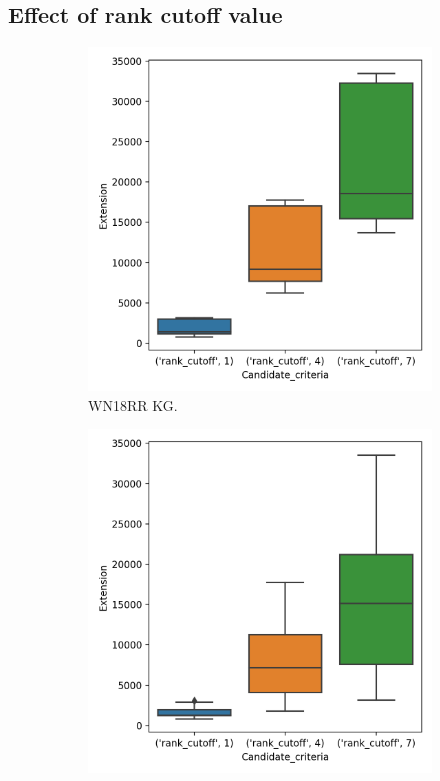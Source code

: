 \newpage
\subsection{Effect of rank cutoff value}

\begin{figure}[h]
\centering
\begin{subfigure}{.5\textwidth}
  \centering
  \includegraphics[width=1\linewidth]{figures/results/ranks/Extension_size_entity_wn18rr.png}
  \caption{WN18RR KG.}
  \label{fig:rank_extension_wn18rr_boxplot_sub}
\end{subfigure}%
\begin{subfigure}{.5\textwidth}
  \centering
  \includegraphics[width=1\linewidth]{figures/results/ranks/Extension_size_entity_family.png}

\end{subfigure}
\end{figure}
